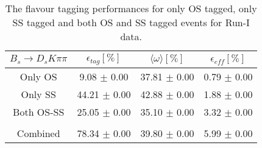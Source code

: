 \begin{table}[h]
\centering
\caption{The flavour tagging performances for only OS tagged, only SS tagged and both OS and SS tagged events for Run-I data.}
\begin{tabular}{c c c c}
\hline
\hline
$ B_s \to D_s K \pi \pi$ & $\epsilon_{tag} [\%]$ & $\langle \omega \rangle [\%] $ & $\epsilon_{eff} [\%]$ \\
\hline
Only OS & 9.08 $\pm$ 0.00 & 37.81 $\pm$ 0.00 & 0.79 $\pm$ 0.00\\
Only SS & 44.21 $\pm$ 0.00 & 42.88 $\pm$ 0.00 & 1.88 $\pm$ 0.00\\
Both OS-SS & 25.05 $\pm$ 0.00 & 35.10 $\pm$ 0.00 & 3.32 $\pm$ 0.00\\
\\
Combined & 78.34 $\pm$ 0.00 & 39.80 $\pm$ 0.00 & 5.99 $\pm$ 0.00\\
\hline
\hline
\end{tabular}
\label{table:tagging_Run1}
\end{table}